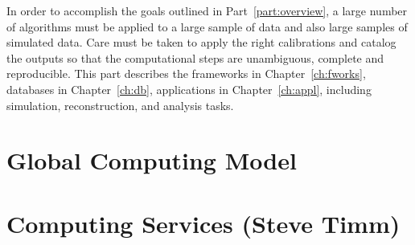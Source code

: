 \documentclass{dune} %
\begin{document}
In order to accomplish the goals outlined in Part~\ref{part:overview}, a large number of algorithms must be applied to a large sample of data and also large samples of simulated data.  Care must be taken to apply the right calibrations and catalog the outputs so that the computational steps are unambiguous, complete and reproducible.  This part describes the frameworks in Chapter~\ref{ch:fworks}, databases in Chapter~\ref{ch:db}, applications in Chapter~\ref{ch:appl}, including simulation, reconstruction, and analysis tasks.

\cleardoublepage

\cleardoublepage


\cleardoublepage

\part{Global Computing Model  } %


\cleardoublepage


\cleardoublepage


\cleardoublepage


\cleardoublepage


\cleardoublepage

\part{Computing Services (Steve Timm)} %


\cleardoublepage


\cleardoublepage


\cleardoublepage


\cleardoublepage


\cleardoublepage


\cleardoublepage

\cleardoublepage
\end{document}
